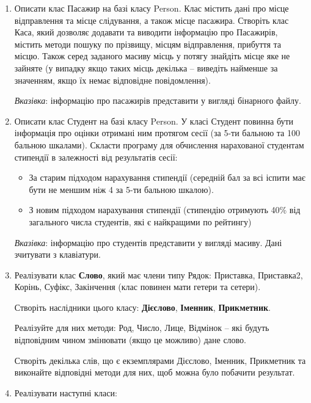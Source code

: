 \documentclass[a5paper,titlepage,openany,twoside,
]
{book_unv}%
\begin{document}
\begin{enumerate}
\def\labelenumi{\arabic{enumi})}
\setcounter{enumi}{2}
\item
  Описати клас Пасажир на базі класу Person. Клас містить дані про місце
  відправлення та місце слідування, а також місце пасажира. Створіть
  клас Каса, який дозволяє додавати та виводити інформацію про
  Пасажирів, містить методи пошуку по прізвищу, місцям відправлення,
  прибуття та місцю. Також серед заданого масиву місць у потягу знайдіть
  місце яке не зайняте (у випадку якщо таких місць декілька -- виведіть
  найменше за значенням, якщо їх немає відповідне повідомлення).

  \emph{\emph{Вказівка}}: інформацію про пасажирів представити у вигляді
бінарного файлу.

\item
  Описати клас Студент на базі класу Person. 
У класі Студент повинна бути інформація про оцінки отримані ним протягом
сесії (за 5-ти бальною та 100 бальною шкалами).
Скласти програму для обчислення нарахованої студентам стипендії в
залежності від результатів сесії:

\begin{itemize}
\item
  За старим підходом нарахування стипендії (середній бал за всі іспити
  має бути не меншим ніж 4 за 5-ти бальною шкалою).
\item
  З новим підходом нарахування стипендії (стипендію отримують 40\% від
  загального числа студентів, які є найкращими по рейтингу)
\end{itemize}

\emph{\emph{Вказівка}}: інформацію про студентів представити у вигляді
масиву. Дані зчитувати з клавіатури.

\item
  Реалізувати клас \textbf{Слово}, який має члени типу Рядок: Приставка,
  Приставка2, Корінь, Суфікс, Закінчення (клас повинен мати гетери та
  сетери).

Створіть наслідники цього класу: \textbf{Дієслово}, \textbf{Іменник}, \textbf{Прикметник}.

Реалізуйте для них методи: Род, Число, Лице, Відмінок -- які будуть
відповідним чином змінювати (якщо це можливо) дане слово.

Створіть декілька слів, що є екземплярами Дієслово, Іменник, Прикметник
та виконайте відповідні методи для них, щоб можна було побачити
результат.

\item
  Реалізувати наступні класи:


\end{enumerate}
\end{document}
